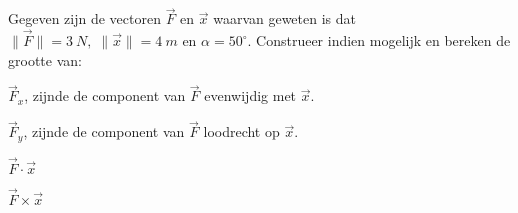 \documentclass{ximera}
\begin{document}
\begin{exercise}

Gegeven zijn de vectoren \(\vec{F}\) en \(\vec{x}\) waarvan geweten is dat \(\| \vec{F} \| = \SI{3}{N}, \; \|\vec{x}\| = \SI{4}{m} \text{ en } \alpha = 50^\circ \).
Construeer indien mogelijk en bereken de grootte van: 

	\begin{image}[0.2\textwidth]
	\end{image}


\begin{question}
	\(\vec{F}_x\), zijnde de component van \(\vec{F}\) evenwijdig met \(\vec{x}\). 
\end{question}

\begin{question}
	\(\vec{F}_y\), zijnde de component van \(\vec{F}\) loodrecht op \(\vec{x}\). 
\end{question}

\begin{question}
	\(\vec{F} \cdot \vec{x}\)
\end{question}

\begin{question}
	\(\vec{F} \times \vec{x}\)
\end{question}

\end{exercise}
\end{document}
